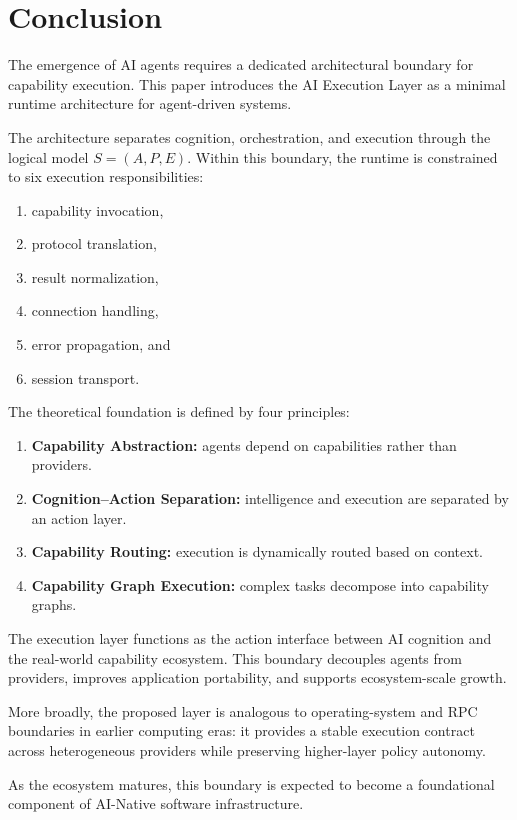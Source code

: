 \section{Conclusion}

The emergence of AI agents requires a dedicated architectural boundary for capability execution. This paper introduces the AI Execution Layer as a minimal runtime architecture for agent-driven systems.

The architecture separates cognition, orchestration, and execution through the logical model $S = (A, P, E)$. Within this boundary, the runtime is constrained to six execution responsibilities:
\begin{enumerate}[leftmargin=1.5em]
    \item capability invocation,
    \item protocol translation,
    \item result normalization,
    \item connection handling,
    \item error propagation, and
    \item session transport.
\end{enumerate}

The theoretical foundation is defined by four principles:
\begin{enumerate}[leftmargin=1.5em]
    \item \textbf{Capability Abstraction:} agents depend on capabilities rather than providers.
    \item \textbf{Cognition--Action Separation:} intelligence and execution are separated by an action layer.
    \item \textbf{Capability Routing:} execution is dynamically routed based on context.
    \item \textbf{Capability Graph Execution:} complex tasks decompose into capability graphs.
\end{enumerate}

The execution layer functions as the action interface between AI cognition and the real-world capability ecosystem. This boundary decouples agents from providers, improves application portability, and supports ecosystem-scale growth.

More broadly, the proposed layer is analogous to operating-system and RPC boundaries in earlier computing eras: it provides a stable execution contract across heterogeneous providers while preserving higher-layer policy autonomy.

As the ecosystem matures, this boundary is expected to become a foundational component of AI-Native software infrastructure.
